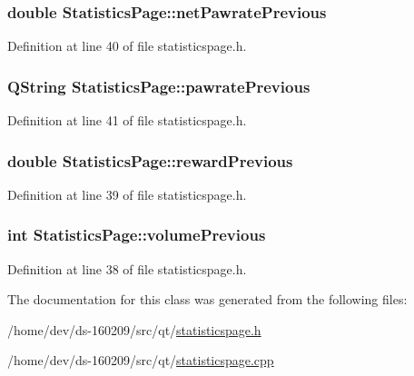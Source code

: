 \hypertarget{class_statistics_page_ab8a85b1fd310e654847b9adf8f0c6048}{}
\subsubsection[{net\+Pawrate\+Previous}]{\setlength{\rightskip}{0pt plus 5cm}double Statistics\+Page\+::net\+Pawrate\+Previous}\label{class_statistics_page_ab8a85b1fd310e654847b9adf8f0c6048}


Definition at line 40 of file statisticspage.\+h.

\hypertarget{class_statistics_page_a7edfdc7c8b7a0162ce9d13b147f4dea4}{}
\subsubsection[{pawrate\+Previous}]{\setlength{\rightskip}{0pt plus 5cm}Q\+String Statistics\+Page\+::pawrate\+Previous}\label{class_statistics_page_a7edfdc7c8b7a0162ce9d13b147f4dea4}


Definition at line 41 of file statisticspage.\+h.

\hypertarget{class_statistics_page_af1cd42e34f124ef0c6db81498bdee183}{}
\subsubsection[{reward\+Previous}]{\setlength{\rightskip}{0pt plus 5cm}double Statistics\+Page\+::reward\+Previous}\label{class_statistics_page_af1cd42e34f124ef0c6db81498bdee183}


Definition at line 39 of file statisticspage.\+h.

\hypertarget{class_statistics_page_a177fce18a55c633a67492ecc116e5766}{}
\subsubsection[{volume\+Previous}]{\setlength{\rightskip}{0pt plus 5cm}int Statistics\+Page\+::volume\+Previous}\label{class_statistics_page_a177fce18a55c633a67492ecc116e5766}


Definition at line 38 of file statisticspage.\+h.



The documentation for this class was generated from the following files\+:\begin{DoxyCompactItemize}
\item 
/home/dev/ds-\/160209/src/qt/\hyperlink{statisticspage_8h}{statisticspage.\+h}\item 
/home/dev/ds-\/160209/src/qt/\hyperlink{statisticspage_8cpp}{statisticspage.\+cpp}\end{DoxyCompactItemize}

